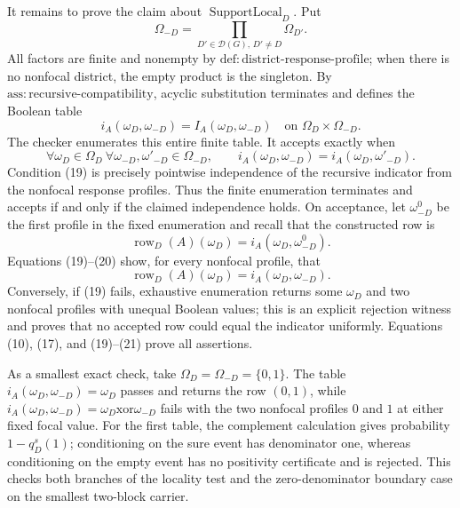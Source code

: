 It remains to prove the claim about \(\operatorname{SupportLocal}_D\).  Put
\[
\Omega_{-D}=\prod_{D'\in\mathcal D(G),\,D'\ne D}\Omega_{D'}.
\]
All factors are finite and nonempty by \(\mathrm{def:district\text{-}response\text{-}profile}\); when there is no nonfocal district, the empty product is the singleton.  By \(\mathrm{ass:recursive\text{-}compatibility}\), acyclic substitution terminates and defines the Boolean table
\[
i_A(\omega_D,\omega_{-D})
=I_A(\omega_D,\omega_{-D})
\quad\text{on }\Omega_D\times\Omega_{-D}.
\tag{18}
\]
The checker enumerates this entire finite table.  It accepts exactly when
\[
\forall\omega_D\in\Omega_D\ \forall\omega_{-D},\omega'_{-D}\in\Omega_{-D},
\qquad
i_A(\omega_D,\omega_{-D})
=i_A(\omega_D,\omega'_{-D}).
\tag{19}
\]
Condition (19) is precisely pointwise independence of the recursive indicator from the nonfocal response profiles.  Thus the finite enumeration terminates and accepts if and only if the claimed independence holds.  On acceptance, let \(\omega_{-D}^0\) be the first profile in the fixed enumeration and recall that the constructed row is
\[
\operatorname{row}_D(A)(\omega_D)
=i_A(\omega_D,\omega_{-D}^0).
\tag{20}
\]
Equations (19)--(20) show, for every nonfocal profile, that
\[
\operatorname{row}_D(A)(\omega_D)
=i_A(\omega_D,\omega_{-D}).
\tag{21}
\]
Conversely, if (19) fails, exhaustive enumeration returns some \(\omega_D\) and two nonfocal profiles with unequal Boolean values; this is an explicit rejection witness and proves that no accepted row could equal the indicator uniformly.  Equations (10), (17), and (19)--(21) prove all assertions.

As a smallest exact check, take \(\Omega_D=\Omega_{-D}=\{0,1\}\).  The table \(i_A(\omega_D,\omega_{-D})=\omega_D\) passes and returns the row \((0,1)\), while \(i_A(\omega_D,\omega_{-D})=\omega_D\mathbin{\mathrm{xor}}\omega_{-D}\) fails with the two nonfocal profiles \(0\) and \(1\) at either fixed focal value.  For the first table, the complement calculation gives probability \(1-q_D^s(1)\); conditioning on the sure event has denominator one, whereas conditioning on the empty event has no positivity certificate and is rejected.  This checks both branches of the locality test and the zero-denominator boundary case on the smallest two-block carrier.